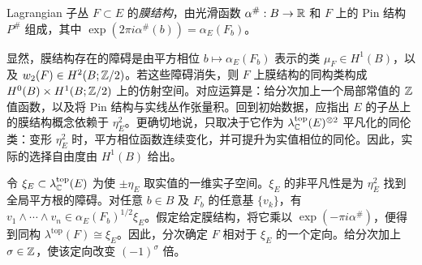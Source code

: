 \begin{definition*}
Lagrangian 子丛 $F\subset E$ 的\emph{膜结构}，由光滑函数 $\alpha^\#:B\to\mathbb R$ 和 $F$ 上的 Pin 结构 $P^\#$ 组成，其中 $\exp(2\pi i\alpha^\#(b))=\alpha_E(F_b)$。
\end{definition*}
显然，膜结构存在的障碍是由平方相位 $b\mapsto\alpha_E(F_b)$ 表示的类 $\mu_F\in H^1(B)$，以及 $w_2(F)\in H^2(B;\mathbb Z/2)$。若这些障碍消失，则 $F$ 上膜结构的同构类构成 $H^0(B)\times H^1(B;\mathbb Z/2)$ 上的仿射空间。对应运算是：给分次加上一个局部常值的 $\mathbb Z$ 值函数，以及将 Pin 结构与实线丛作张量积。回到初始数据，应指出 $E$ 的子丛上的膜结构概念依赖于 $\eta_E^2$。更确切地说，只取决于它作为 $\lambda_{\mathbb C}^{\mathrm{top}}(E)^{\otimes2}$ 平凡化的同伦类：变形 $\eta_E^2$ 时，平方相位函数连续变化，并可提升为实值相位的同伦。因此，实际的选择自由度由 $H^1(B)$ 给出。
\begin{note}\label{st:11.18}
令 $\xi_E\subset\lambda_{\mathbb C}^{\mathrm{top}}(E)$ 为使 $\pm\eta_E$ 取实值的一维实子空间。$\xi_E$ 的非平凡性是为 $\eta_E^2$ 找到全局平方根的障碍。对任意 $b\in B$ 及 $F_b$ 的任意基 $\{v_k\}$，有 $v_1\wedge\cdots\wedge v_n\in\alpha_E(F_b)^{1/2}\xi_E$。假定给定膜结构，将它乘以 $\exp(-\pi i\alpha^\#)$，便得到同构 $\lambda^{\mathrm{top}}(F)\cong\xi_E$。因此，分次确定 $F$ 相对于 $\xi_E$ 的一个定向。给分次加上 $\sigma\in\mathbb Z$，使该定向改变 $(-1)^\sigma$ 倍。
\end{note}

